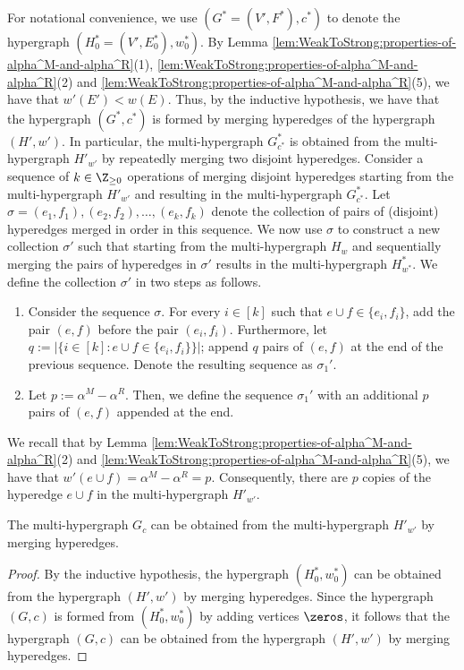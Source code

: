     \iffalse
    For notational convenience, we use  $(G^* = (V', F^*), c^*)$ to denote the  hypergraph $ (H_0^* = (V', E_0^*), w_0^*)$. By Lemma \ref{lem:WeakToStrong:properties-of-alpha^M-and-alpha^R}(1), \ref{lem:WeakToStrong:properties-of-alpha^M-and-alpha^R}(2) and \ref{lem:WeakToStrong:properties-of-alpha^M-and-alpha^R}(5), we have that $w'(E') < w(E)$. Thus, by the inductive hypothesis, we have that the hypergraph $(G^*, c^*)$ is formed by merging hyperedges of the hypergraph $(H', w')$. In particular, the multi-hypergraph $G^*_{c^*}$ is obtained from the multi-hypergraph $H'_{w'}$ by repeatedly merging two disjoint hyperedges. Consider a sequence of $k \in \Z_{\geq 0}$ operations of merging disjoint hyperedges starting from the multi-hypergraph $H'_{w'}$ and resulting in the multi-hypergraph $G^*_{c^*}$. Let $\sigma = (e_1, f_1), (e_2, f_2), \ldots, (e_k, f_k)$ denote the collection of pairs of (disjoint) hyperedges merged in order in this sequence. We now use $\sigma$ to construct a new collection $\sigma'$ such that starting from the multi-hypergraph $H_w$ and sequentially merging the pairs of hyperedges in $\sigma'$   results in the multi-hypergraph $H^*_{w^*}$. We define the collection $\sigma'$ in two steps as follows.
    \begin{enumerate}
        \item Consider the sequence $\sigma$. For every $i \in [k]$ such that $e\cup f \in \{e_i, f_i\}$, add the pair $(e, f)$ before the pair $(e_i, f_i)$. Furthermore, let $q := |\{i \in [k] : e\cup f \in \{e_i, f_i\}\}|$; append $q$ pairs of $(e, f)$ at the end of the previous sequence. Denote the resulting sequence as $\sigma_1'$.
        \item Let $p := \alpha^M - \alpha^R$. Then, we define the sequence $\sigma_1'$ with an additional $p$ pairs of $(e, f)$ appended at the end.
    \end{enumerate}
    
    We recall that by Lemma \ref{lem:WeakToStrong:properties-of-alpha^M-and-alpha^R}(2) and \ref{lem:WeakToStrong:properties-of-alpha^M-and-alpha^R}(5), we have that $w'(e\cup f) = \alpha^M - \alpha^R = p$. Consequently, there are $p$ copies of the hyperedge $e\cup f$ in the multi-hypergraph $H'_{w'}$. 
    \begin{claim}
        The multi-hypergraph $G_c$ can be obtained from the multi-hypergraph $H'_{w'}$ by merging hyperedges.
    \end{claim}
    \begin{proof}
        By the inductive hypothesis, the hypergraph $(H^*_0, w^*_0)$ can be obtained from the hypergraph $(H', w')$ by merging hyperedges. Since the hypergraph $(G, c)$ is formed from $(H_0^*, w_0^*)$ by adding vertices $\zeros$, it follows that the hypergraph $(G, c)$ can be obtained from the hypergraph $(H', w')$ by merging hyperedges.            
    \end{proof}

